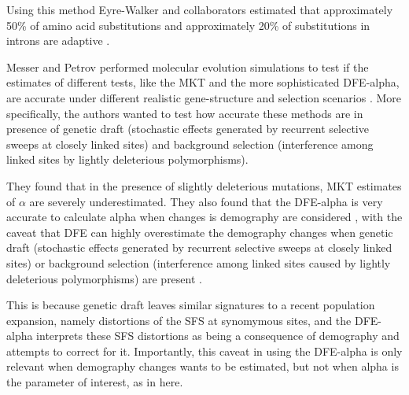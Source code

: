 Using this method Eyre-Walker and collaborators estimated that approximately 50\% of amino acid substitutions and approximately 20\% of substitutions in introns are adaptive
	\citep{Eyre-Walker2009}.

Messer and Petrov performed molecular evolution simulations to test if the estimates of different tests, like the MKT and the more sophisticated DFE-alpha, are accurate under different realistic gene-structure and selection scenarios
	\citep{Messer2013}.
More specifically, the authors wanted to test how accurate these methods are in presence of genetic draft (stochastic effects generated by recurrent selective sweeps at closely linked sites)
and background selection (interference among linked sites by lightly deleterious polymorphisms).

They found that in the presence of slightly deleterious mutations, MKT estimates of $\alpha$ are severely underestimated.
They also found that the DFE-alpha is very accurate to calculate alpha when changes is demography are considered \citep{Messer2013}, with the caveat that DFE can highly overestimate the demography changes when genetic draft (stochastic effects generated by recurrent selective sweeps at closely linked sites) or background selection (interference among linked sites caused by lightly deleterious polymorphisms) are present \citep{Messer2013}.

This is because genetic draft leaves similar signatures to a recent population expansion, namely distortions of the SFS at synomymous sites, and the DFE-alpha interprets these SFS distortions as being a consequence of demography and attempts to correct for it.
Importantly, this caveat in using the DFE-alpha is only relevant when demography changes wants to be estimated, but not when alpha is the parameter of interest, as in here.
